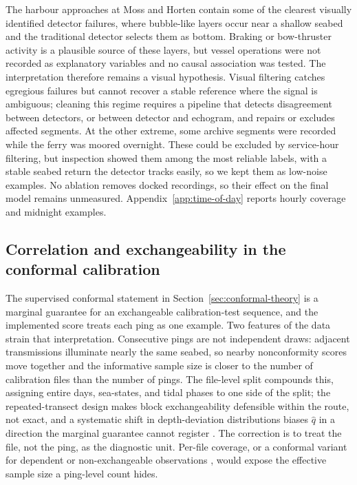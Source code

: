 The harbour approaches at Moss and Horten contain some of the clearest visually identified detector failures, where bubble-like layers occur near a shallow seabed and the traditional detector selects them as bottom. Braking or bow-thruster activity is a plausible source of these layers, but vessel operations were not recorded as explanatory variables and no causal association was tested. The interpretation therefore remains a visual hypothesis. Visual filtering catches egregious failures but cannot recover a stable reference where the signal is ambiguous; cleaning this regime requires a pipeline that detects disagreement between detectors, or between detector and echogram, and repairs or excludes affected segments. At the other extreme, some archive segments were recorded while the ferry was moored overnight. These could be excluded by service-hour filtering, but inspection showed them among the most reliable labels, with a stable seabed return the detector tracks easily, so we kept them as low-noise examples. No ablation removes docked recordings, so their effect on the final model remains unmeasured. Appendix~\ref{app:time-of-day} reports hourly coverage and midnight examples.

\subsection{Correlation and exchangeability in the conformal calibration}
\label{sec:conformal-exchangeability}
The supervised conformal statement in Section~\ref{sec:conformal-theory} is a marginal guarantee for an exchangeable calibration-test sequence, and the implemented score treats each ping as one example. Two features of the data strain that interpretation. Consecutive pings are not independent draws: adjacent transmissions illuminate nearly the same seabed, so nearby nonconformity scores move together and the informative sample size is closer to the number of calibration files than the number of pings. The file-level split compounds this, assigning entire days, sea-states, and tidal phases to one side of the split; the repeated-transect design makes block exchangeability defensible within the route, not exact, and a systematic shift in depth-deviation distributions biases $\hat q$ in a direction the marginal guarantee cannot register \cite{tibshirani_conformal_2019}. The correction is to treat the file, not the ping, as the diagnostic unit. Per-file coverage, or a conformal variant for dependent or non-exchangeable observations \cite{chernozhukov_exact_2018,barber_conformal_2023}, would expose the effective sample size a ping-level count hides.

